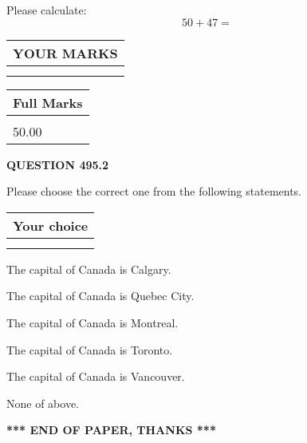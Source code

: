 \documentclass[12pt]{article}
\begin{document}
  
 
Please calculate:
\begin{equation}
50 +  %
47 = \nonumber
\end{equation}
 

 

 
  
\vspace{0.2in}
  
\noindent\begin{tabular}{|l|}
\hline
 YOUR MARKS  \\
\hline
 \\ 
 \\ 
\hline
\end{tabular}
\hspace{0.05in} \begin{tabular}{|l|}
\hline
 Full Marks  \\
\hline
 \\ 
50.00 \\
\hline
\end{tabular}
{\textbf{\Large{QUESTION
495.2 
}}}
  
  
Please choose the correct one from the following statements.
  
  
\noindent\hspace{3.0in} \begin{tabular}{|l|}
\hline
Your choice \\
\hline
 \\ 
 \\ 
\hline
\end{tabular}
  
  
 
 
The capital of Canada is Calgary.
 
 
The capital of Canada is Quebec City.
 
 
The capital of Canada is Montreal.
 
 
The capital of Canada is Toronto.
 
 
The capital of Canada is Vancouver.
 
 
 None of above.
 
 
   
   
 \vspace{0.2in}
 
   
   
   
   
\vspace{1.0in} 
{\textbf{\large{ *** END OF PAPER, THANKS *** }}} 
   
\end{document}
